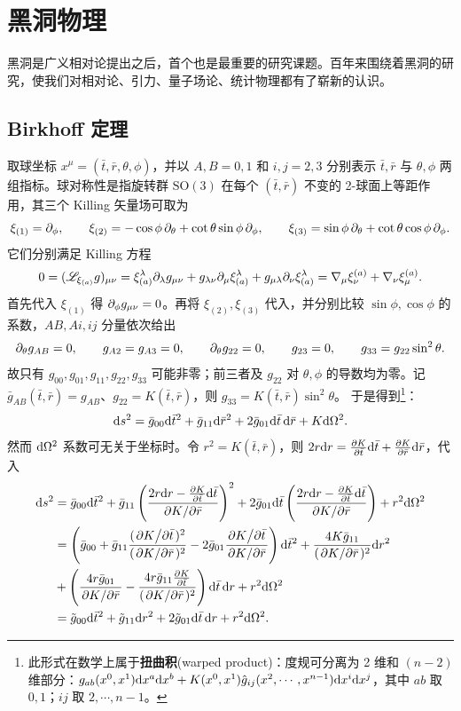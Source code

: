 \chapter{黑洞物理}\label{chpt:BH}

黑洞是广义相对论提出之后，首个也是最重要的研究课题。百年来围绕着黑洞的研究，使我们对相对论、引力、量子场论、统计物理都有了崭新的认识。

\section{Birkhoff 定理}

取球坐标 $x^\mu=(\bar t,\bar r,\theta,\phi)$，并以 $A,B=0,1$ 和 $i,j=2,3$ 分别表示 $\bar t,\bar r$ 与 $\theta,\phi$ 两组指标。球对称性是指旋转群 $\mathrm{SO}(3)$ 在每个 $(\bar t,\bar r)$ 不变的 2-球面上等距作用，其三个 Killing 矢量场可取为
\[
    \xi_{(1)}=\partial_\phi,\qquad
    \xi_{(2)}=-\cos\phi\,\partial_\theta+\cot\theta\sin\phi\,\partial_\phi,\qquad
    \xi_{(3)}=\sin\phi\,\partial_\theta+\cot\theta\cos\phi\,\partial_\phi.
\]
它们分别满足 Killing 方程
\[
    0=(\mathscr{L}_{\xi_{(a)}}g)_{\mu\nu}
    =\xi_{(a)}^\lambda\partial_\lambda g_{\mu\nu}
    +g_{\lambda\nu}\partial_\mu\xi_{(a)}^\lambda
    +g_{\mu\lambda}\partial_\nu\xi_{(a)}^\lambda
    =\nabla_\mu\xi^{(a)}_\nu+\nabla_\nu\xi^{(a)}_\mu.
\]
首先代入 $\xi_{(1)}$ 得 $\partial_\phi g_{\mu\nu}=0$。再将 $\xi_{(2)},\xi_{(3)}$ 代入，并分别比较 $\sin\phi,\cos\phi$ 的系数，$AB,Ai,ij$ 分量依次给出
\[
    \partial_\theta g_{AB}=0,\qquad
    g_{A2}=g_{A3}=0,\qquad
    \partial_\theta g_{22}=0,\qquad
    g_{23}=0,\qquad
    g_{33}=g_{22}\sin^2\theta.
\]
故只有 $g_{00},g_{01},g_{11},g_{22},g_{33}$ 可能非零；前三者及 $g_{22}$ 对 $\theta,\phi$ 的导数均为零。记 $\bar g_{AB}(\bar t,\bar r)=g_{AB}$、$g_{22}=K(\bar t,\bar r)$，则 $g_{33}=K(\bar t,\bar r)\sin^2\theta$。
于是得到\footnote{此形式在数学上属于\textbf{扭曲积}(warped product)：度规可分离为 2 维和 $(n-2)$ 维部分：$g_{ab}(x^0,x^1)\dd x^a\dd x^b+K(x^0,x^1)\hat g_{ij}(x^2,\cdots,x^{n-1})\dd x^i\dd x^j$，其中 $ab$ 取 $0,1$；$ij$ 取 $2,\cdots,n-1$。}：
\[\dd s^2=\bar g_{00}\dd\bar t^2+\bar g_{11}\dd\bar r^2+2\bar g_{01}\dd\bar t\,\dd\bar r+K\dd\Omega^2.\]
然而 $\dd\Omega^2$ 系数可无关于坐标时。令 $r^2=K(\bar t,\bar r)$，则 $2r\dd r=\pdv{K}{\bar t}\dd\bar t+\pdv{K}{\bar r}\dd\bar r$，代入
\begin{align*}
    \dd s^2&=\bar g_{00}\dd\bar t^2+\bar g_{11}\left(\frac{2r\dd r-\pdv{K}{\bar t}\dd\bar t}{\pdv*{K}{\bar r}}\right)^2+2\bar g_{01}\dd\bar t\left(\frac{2r\dd r-\pdv{K}{\bar t}\dd\bar t}{\pdv*{K}{\bar r}}\right)+r^2\dd\Omega^2\\
    &=\left(\bar g_{00}+\bar g_{11}\frac{(\pdv*{K}{\bar t})^2}{(\pdv*{K}{\bar r})^2}-2\bar g_{01}\frac{\pdv*{K}{\bar t}}{\pdv*{K}{\bar r}}\right)\dd\bar t^2+\frac{4K\bar g_{11}}{(\pdv*{K}{\bar r})^2}\dd r^2\\
    &+\left(\frac{4r\bar g_{01}}{\pdv*{K}{\bar r}}-\frac{4r\bar g_{11}\pdv{K}{\bar t}}{(\pdv*{K}{\bar r})^2}\right)\dd\bar t\,\dd r+r^2\dd\Omega^2\\
    &=\tilde g_{00}\dd\bar t^2+\tilde g_{11}\dd r^2+2\tilde g_{01}\dd\bar t\,\dd r+r^2\dd\Omega^2.
\end{align*}
